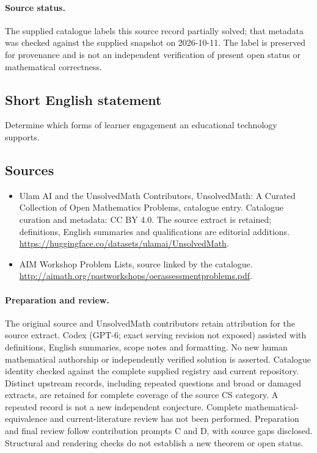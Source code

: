 \documentclass[11pt]{article}
\begin{document}
\paragraph{Source status.}
The supplied catalogue labels this source record partially solved; that metadata was checked against the supplied snapshot on 2026-10-11. The label is preserved for provenance and is not an independent verification of present open status or mathematical correctness.
\subsection{Short English statement}
Determine which forms of learner engagement an educational technology supports.
\subsection{Sources}
\begin{itemize}
\item[\hypertarget{source:statement:1}{S1}] Ulam AI and the UnsolvedMath Contributors, UnsolvedMath: A Curated Collection of Open Mathematics Problems, catalogue entry. Catalogue curation and metadata: CC BY 4.0. The source extract is retained; definitions, English summaries and qualifications are editorial additions.
\url{https://huggingface.co/datasets/ulamai/UnsolvedMath}.
\item[\hypertarget{source:statement:2}{S2}] AIM Workshop Problem Lists, source linked by the catalogue.
\url{http://aimath.org/pastworkshops/oerassessmentproblems.pdf}.
\end{itemize}
\paragraph{Preparation and review.}
The original source and UnsolvedMath contributors retain attribution for the source extract. Codex (GPT-6; exact serving revision not exposed) assisted with definitions, English summaries, scope notes and formatting. No new human mathematical authorship or independently verified solution is asserted. Catalogue identity checked against the complete supplied registry and current repository. Distinct upstream records, including repeated questions and broad or damaged extracts, are retained for complete coverage of the source CS category. A repeated record is not a new independent conjecture. Complete mathematical-equivalence and current-literature review has not been performed. Preparation and final review follow contribution prompts C and D, with source gaps disclosed. Structural and rendering checks do not establish a new theorem or open status.
\label{end:statement}
\end{document}
